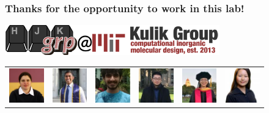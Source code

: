\documentclass[xcolor=dvipsnames]{beamer}
\begin{document}
\begin{frame}
\frametitle{Thanks for the opportunity to work in this lab!}
\includegraphics[height=1.3cm]{img/group/grp.png}
\begin{table}[]
	\centering
	\begin{tabular}{llllll}
		\includegraphics[width=1.5cm]{img/group/heather.png}  & \includegraphics[width=1.5cm]{img/group/aditya.jpg}  & \includegraphics[width=1.5cm]{img/group/akash.png}  & \includegraphics[width=1.5cm]{img/group/chenru.jpg} & \includegraphics[width=1.5cm]{img/group/fang.jpg} & \includegraphics[width=1.5cm]{img/group/helena.jpg} \\
		

\end{tabular}
\end{table}
\end{frame}
\end{document}
